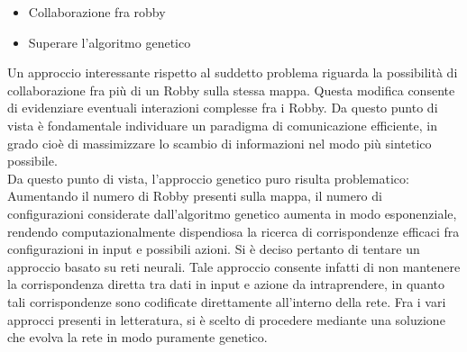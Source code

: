 \begin{itemize}
 \item Collaborazione fra robby
 \item Superare l'algoritmo genetico
\end{itemize}

Un approccio interessante rispetto al suddetto problema riguarda la possibilità
di collaborazione fra più di un Robby sulla stessa mappa. Questa modifica
consente di evidenziare eventuali interazioni complesse fra i Robby. Da questo
punto di vista è fondamentale individuare un paradigma di comunicazione
efficiente, in grado cioè di massimizzare lo scambio di informazioni nel modo
più sintetico possibile.\\

Da questo punto di vista, l'approccio genetico puro risulta problematico:
Aumentando il numero di Robby presenti sulla mappa, il numero di configurazioni
considerate dall'algoritmo genetico aumenta in modo esponenziale, rendendo
computazionalmente dispendiosa la ricerca di corrispondenze efficaci fra
configurazioni in input e possibili azioni. Si è deciso pertanto di tentare
un approccio basato su reti neurali. Tale approccio consente infatti di non
mantenere la corrispondenza diretta tra dati in input e azione da intraprendere,
in quanto tali corrispondenze sono codificate direttamente all'interno della
rete. Fra i vari approcci presenti in letteratura, si è scelto di procedere
mediante una soluzione che evolva la rete in modo puramente genetico.
